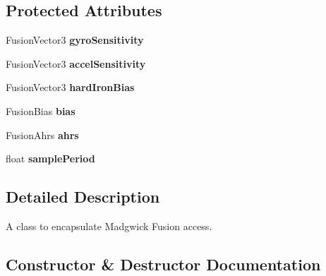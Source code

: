 \subsection*{Protected Attributes}
\begin{DoxyCompactItemize}
\item 
\mbox{\label{classIMUFusion_ab0606b1bd85ac4b5c60296f4d11f8aad}} 
Fusion\+Vector3 {\bfseries gyro\+Sensitivity}
\item 
\mbox{\label{classIMUFusion_aeb57532923c759a15220d4e1480a9793}} 
Fusion\+Vector3 {\bfseries accel\+Sensitivity}
\item 
\mbox{\label{classIMUFusion_a190967d6da7b3375520be36f5cd0c88f}} 
Fusion\+Vector3 {\bfseries hard\+Iron\+Bias}
\item 
\mbox{\label{classIMUFusion_add7a4e02f169aa10e13f4dfb718d0875}} 
Fusion\+Bias {\bfseries bias}
\item 
\mbox{\label{classIMUFusion_a1290813d01c634775a0ffb4f3fef80eb}} 
Fusion\+Ahrs {\bfseries ahrs}
\item 
\mbox{\label{classIMUFusion_a9d546ef52bd0f573486527f6f9e57138}} 
float {\bfseries sample\+Period}
\end{DoxyCompactItemize}


\subsection{Detailed Description}
A class to encapsulate Madgwick Fusion access. 



\subsection{Constructor \& Destructor Documentation}
\mbox{\label{classIMUFusion_ab4624c7f974e2e9328b62a6b945dbeb4}} 
